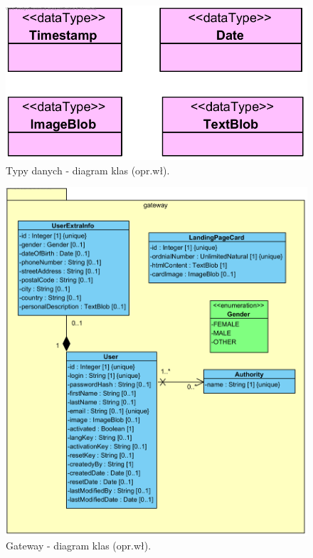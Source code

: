 \begin{minipage}{\textwidth}
    \begin{figure}[H]
        \centering\includegraphics[scale=0.7]{../uml/class_diagrams/dataTypes.png}
        \caption{Typy danych - diagram klas (opr.wł).}\label{rysunek:class-diagram-data-types}
    \end{figure}
\end{minipage}

\begin{minipage}{\textwidth}
    \begin{figure}[H]
        \centering\includegraphics[scale=0.7]{../uml/class_diagrams/gateway.png}
        \caption{Gateway - diagram klas (opr.wł).}\label{rysunek:class-diagram-gateway}
    \end{figure}
\end{minipage}

